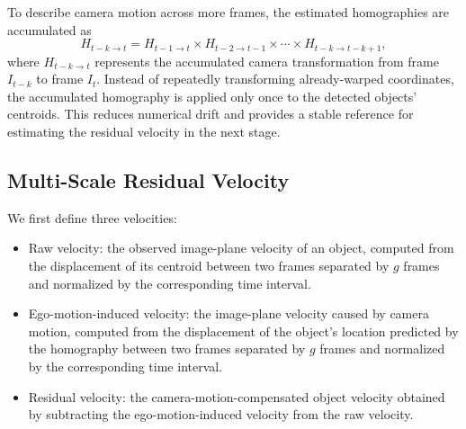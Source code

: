 \documentclass{article}
\begin{document}
To describe camera motion across more frames, the estimated homographies are accumulated as
\begin{equation}
  H_{t-k \to t} = H_{t-1 \to t} \times H_{t-2 \to t-1} \times \cdots \times H_{t-k \to t-k+1},
  \label{eq:cumulative}
\end{equation}
where $H_{t-k \to t}$ represents the accumulated camera transformation from frame $I_{t-k}$ to frame $I_t$. Instead of repeatedly transforming already-warped coordinates, the accumulated homography is applied only once to the detected objects' centroids. This reduces numerical drift and provides a stable reference for estimating the residual velocity in the next stage.

\subsection{Multi-Scale Residual Velocity}
\label{sec:residual}
We first define three velocities:
\begin{itemize}
  \item Raw velocity: the observed image-plane velocity of an object, computed from the displacement of its centroid between two frames separated by $g$ frames and normalized by the corresponding time interval.
  \item Ego-motion-induced velocity: the image-plane velocity caused by camera motion, computed from the displacement of the object's location predicted by the homography between two frames separated by $g$ frames and normalized by the corresponding time interval.
  \item Residual velocity: the camera-motion-compensated object velocity obtained by subtracting the ego-motion-induced velocity from the raw velocity.
\end{itemize}
\end{document}
